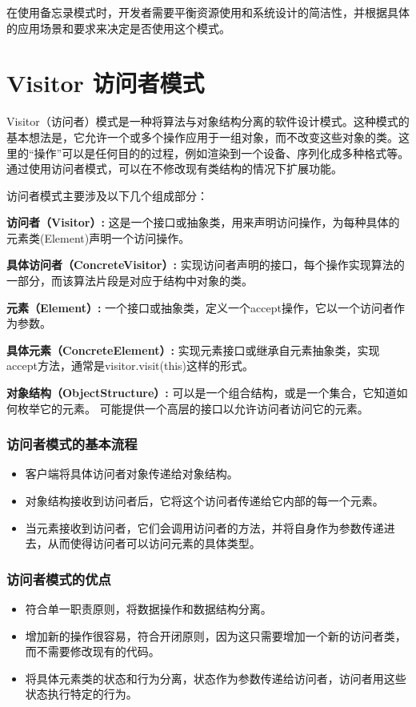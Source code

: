 在使用备忘录模式时，开发者需要平衡资源使用和系统设计的简洁性，并根据具体的应用场景和要求来决定是否使用这个模式。

\section{Visitor 访问者模式}
Visitor（访问者）模式是一种将算法与对象结构分离的软件设计模式。这种模式的基本想法是，它允许一个或多个操作应用于一组对象，而不改变这些对象的类。这里的“操作”可以是任何目的的过程，例如渲染到一个设备、序列化成多种格式等。通过使用访问者模式，可以在不修改现有类结构的情况下扩展功能。

访问者模式主要涉及以下几个组成部分：

\textbf{访问者（Visitor）:}
这是一个接口或抽象类，用来声明访问操作，为每种具体的元素类(Element)声明一个访问操作。

\textbf{具体访问者（ConcreteVisitor）:}
实现访问者声明的接口，每个操作实现算法的一部分，而该算法片段是对应于结构中对象的类。

\textbf{元素（Element）:}
一个接口或抽象类，定义一个accept操作，它以一个访问者作为参数。

\textbf{具体元素（ConcreteElement）:}
实现元素接口或继承自元素抽象类，实现accept方法，通常是visitor.visit(this)这样的形式。

\textbf{对象结构（ObjectStructure）:}
可以是一个组合结构，或是一个集合，它知道如何枚举它的元素。
可能提供一个高层的接口以允许访问者访问它的元素。

\subsubsection{访问者模式的基本流程}

\begin{itemize}
	\item 客户端将具体访问者对象传递给对象结构。
	\item 对象结构接收到访问者后，它将这个访问者传递给它内部的每一个元素。
	\item 当元素接收到访问者，它们会调用访问者的方法，并将自身作为参数传递进去，从而使得访问者可以访问元素的具体类型。
\end{itemize}

\subsubsection{访问者模式的优点}

\begin{itemize}
	\item 符合单一职责原则，将数据操作和数据结构分离。
	\item 增加新的操作很容易，符合开闭原则，因为这只需要增加一个新的访问者类，而不需要修改现有的代码。
	\item 将具体元素类的状态和行为分离，状态作为参数传递给访问者，访问者用这些状态执行特定的行为。
\end{itemize}

